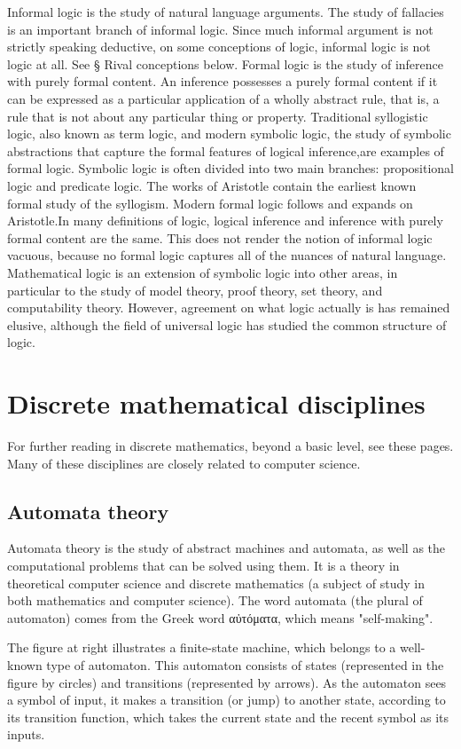 \documentclass{article}
\begin{document}
    Informal logic is the study of natural language arguments. The study of fallacies is an important branch of informal logic. Since much informal argument is not strictly speaking deductive, on some conceptions of logic, informal logic is not logic at all. See § Rival conceptions below.
    Formal logic is the study of inference with purely formal content. An inference possesses a purely formal content if it can be expressed as a particular application of a wholly abstract rule, that is, a rule that is not about any particular thing or property. Traditional syllogistic logic, also known as term logic, and modern symbolic logic, the study of symbolic abstractions that capture the formal features of logical inference,are examples of formal logic. Symbolic logic is often divided into two main branches: propositional logic and predicate logic. The works of Aristotle contain the earliest known formal study of the syllogism. Modern formal logic follows and expands on Aristotle.In many definitions of logic, logical inference and inference with purely formal content are the same. This does not render the notion of informal logic vacuous, because no formal logic captures all of the nuances of natural language.
    Mathematical logic is an extension of symbolic logic into other areas, in particular to the study of model theory, proof theory, set theory, and computability theory.
However, agreement on what logic actually is has remained elusive, although the field of universal logic has studied the common structure of logic.
\section{Discrete mathematical disciplines}
For further reading in discrete mathematics, beyond a basic level, see these pages. Many of these disciplines are closely related to computer science.
\subsection{Automata theory}
Automata theory is the study of abstract machines and automata, as well as the computational problems that can be solved using them. It is a theory in theoretical computer science and discrete mathematics (a subject of study in both mathematics and computer science). The word automata (the plural of automaton) comes from the Greek word αὐτόματα, which means "self-making".

The figure at right illustrates a finite-state machine, which belongs to a well-known type of automaton. This automaton consists of states (represented in the figure by circles) and transitions (represented by arrows). As the automaton sees a symbol of input, it makes a transition (or jump) to another state, according to its transition function, which takes the current state and the recent symbol as its inputs.
\end{document}
